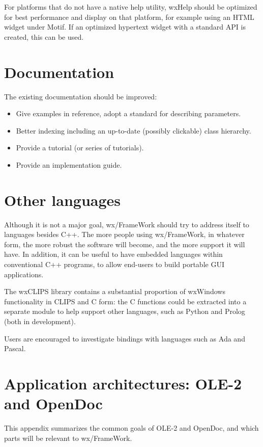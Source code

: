 For platforms that do not have a native help utility, wxHelp should be
optimized for best performance and display on that platform, for example using an
HTML widget under Motif. If an optimized hypertext widget with a standard API is
created, this can be used.

\chapter{Documentation}

The existing documentation should be improved:

\begin{itemize}
\item Give examples in reference, adopt a standard for describing parameters.
\item Better indexing including an up-to-date (possibly clickable) class
hierarchy.
\item Provide a tutorial (or series of tutorials).
\item Provide an implementation guide.
\end{itemize}

\chapter{Other languages}

Although it is not a major goal, wx/FrameWork should try to address
itself to languages besides C++. The more people using wx/FrameWork, in
whatever form, the more robust the software will become, and the more
support it will have. In addition, it can be useful to have embedded
languages within conventional C++ programs, to allow end-users to build
portable GUI applications.

The wxCLIPS library contains a substantial proportion of wxWindows
functionality in CLIPS and C form: the C functions could be extracted
into a separate module to help support other languages, such as Python
and Prolog (both in development).

Users are encouraged to investigate bindings with languages such as Ada
and Pascal.

\appendix
\chapter{Application architectures: OLE-2 and OpenDoc}

This appendix summarizes the common goals of OLE-2 and OpenDoc, and
which parts will be relevant to wx/FrameWork.

